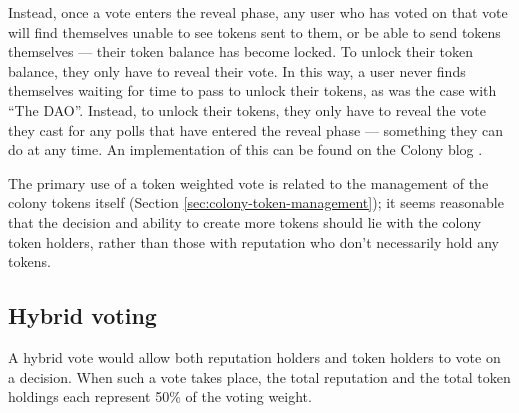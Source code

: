 Instead, once a vote enters the reveal phase, any user who has voted on that vote will find themselves unable to see tokens sent to them, or be able to send tokens themselves --- their token balance has become locked. To unlock their token balance, they only have to reveal their vote. In this way, a user never finds themselves waiting for time to pass to unlock their tokens, as was the case with ``The DAO''. Instead, to unlock their tokens, they only have to reveal the vote they cast for any polls that have entered the reveal phase --- something they can do at any time. An implementation of this can be found on the Colony blog \cite{ColonyVoting}.

The primary use of a token weighted vote is related to the management of the colony tokens itself (Section \ref{sec:colony-token-management}); it seems reasonable that the decision and ability to create more tokens should lie with the colony token holders, rather than those with reputation who don't necessarily hold any tokens.

\subsection{Hybrid voting}
A hybrid vote would allow both reputation holders and token holders to vote on a decision. When such a vote takes place, the total reputation and the total token holdings each represent 50\% of the voting weight.